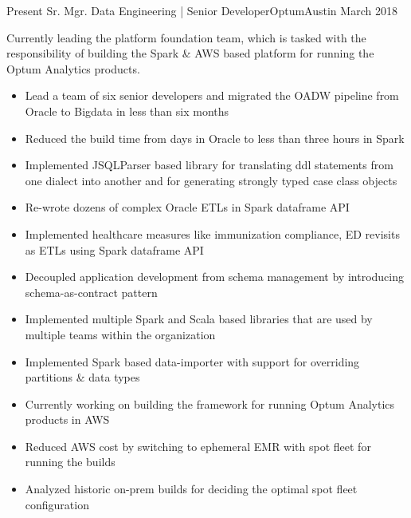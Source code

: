 %
%
%

\begin{experiences}
  \experience
    {Present}   {Sr. Mgr. Data Engineering | Senior Developer}{Optum}{Austin}
    {March 2018} {
    				  Currently leading the platform foundation team, which is tasked with the responsibility of building the Spark \& AWS based platform for running the Optum Analytics products.
                      \begin{itemize}
                        \item Lead a team of six senior developers and migrated the OADW pipeline from Oracle to Bigdata in less than six months
                       	\item Reduced the build time from days in Oracle to less than three hours in Spark
                       	\item Implemented JSQLParser based library for translating ddl statements from one dialect into another and for generating strongly typed case class objects
                       	\item Re-wrote dozens of complex Oracle ETLs in Spark dataframe API
                       	\item Implemented healthcare measures like immunization compliance, ED revisits as ETLs using Spark dataframe API
                       	\item Decoupled application development from schema management by introducing schema-as-contract pattern
                       	\item Implemented multiple Spark and Scala based libraries that are used by multiple teams within the organization
                       	\item Implemented Spark based data-importer with support for overriding partitions \& data types
                        \item Currently working on building the framework for running Optum Analytics products in AWS  
                        \item Reduced AWS cost by switching to ephemeral EMR with spot fleet for running the builds 
                       	\item Analyzed historic on-prem builds for deciding the optimal spot fleet configuration

\end{itemize}}
\end{experiences}
